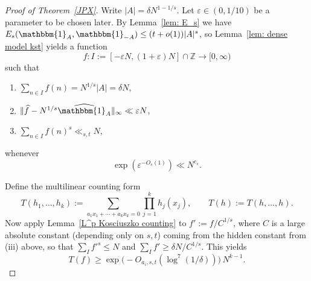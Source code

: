 \documentclass[A4paper,reqno,oneside,12pt]{amsart}
\theoremstyle{plain}
\theoremstyle{definition}
\newcommand{\e}{\mathbbm{1}}          %
\newcommand{\Z}{\mathbb{Z}}
\begin{document}
\begin{proof}[Proof of Theorem~\ref{JPX}]
Write $|A|=\delta N^{1-1/s}$.
Let $\varepsilon\in(0,1/10)$ be a parameter to be chosen later. By Lemma~\ref{lem: E_s} we have $E_s(\e_A,\e_{-A})\le (t+o(1))|A|^s$, so Lemma~\ref{lem: dense model kst} yields a function
\[
f:I:=[-\varepsilon N,(1+\varepsilon)N]\cap\Z\to[0,\infty)
\]
such that
\begin{enumerate}[label=(\roman*)]
\item $\sum_{n\in I} f(n)=N^{1/s}|A|=\delta N$,
\item $\|\widehat f-N^{1/s}\widehat{\e_A}\|_\infty\ll \varepsilon N$,
\item $\sum_{n\in I} f(n)^s\ll_{s,t} N$,
\end{enumerate}
whenever 
\begin{equation}\label{eq: bound for epsilon}
      \exp(\varepsilon^{-O_s(1)})\ll N^{c_s}. 
\end{equation}


Define the multilinear counting form
\[
T(h_1,\dots,h_k):=\sum_{a_1x_1+\cdots +a_kx_k = 0}\prod_{j=1}^k h_j(x_j),
\qquad
T(h):=T(h,\dots,h).
\]
Now apply Lemma~\ref{L^p Kosciuszko counting} to $f':=f/C^{1/s}$, where $C$ is a large absolute constant (depending only on $s,t$) coming from the hidden constant from (iii) above, so that $\sum_I f'^s\le N$ and $\sum_I f'\ge \delta N/C^{1/s}$. This yields
\begin{equation}\label{eq:Tf-lower}
T(f)\ge \exp\bigl(-O_{a_i,s,t}(\log^7(1/\delta))\bigr)\,N^{k-1}.
\end{equation}


\end{proof}
\end{document}
